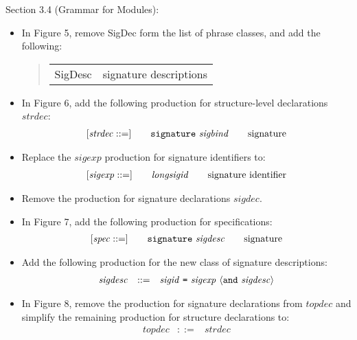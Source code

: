 \documentclass[twoside,titlepage]{article}
\begin{document}
\begin{appendix}
Section 3.4 (Grammar for Modules):
\begin{itemize}
\item In Figure 5, remove SigDec form the list of phrase classes, and add the following:
  \begin{quote}
  \begin{tabular}{ll}
  SigDesc & signature descriptions
  \end{tabular}
  \end{quote}

\item In Figure 6, add the following production for structure-level declarations $\mathit{strdec}$:
  $$
  \begin{array}{l@{\qquad}l@{\qquad}l}
  [\mathit{strdec} ::=] & {\tt{signature}}~\mathit{sigbind} & \textrm{signature} \\
  \end{array}
  $$

\item Replace the $\mathit{sigexp}$ production for signature identifiers to:
  $$
  \begin{array}{l@{\qquad}l@{\qquad}l}
  [\mathit{sigexp} ::=] & \mathit{longsigid} & \textrm{signature identifier} \\
  \end{array}
  $$

\item Remove the production for signature declarations $\mathit{sigdec}$.

\item In Figure 7, add the following production for specifications:
  $$
  \begin{array}{l@{\qquad}l@{\qquad}l}
  [\mathit{spec} ::=] & {\tt{signature}}~\mathit{sigdesc} & \textrm{signature} \\
  \end{array}
  $$

\item Add the following production for the new class of signature descriptions:
  $$
  \begin{array}{lll}
  \mathit{sigdesc} & ::= & \mathit{sigid}~\mbox{\tt=}~\mathit{sigexp}~\langle{\tt{and}}~\mathit{sigdesc}\rangle \\
  \end{array}
  $$

\item In Figure 8, remove the production for signature declarations from $\mathit{topdec}$ and simplify the remaining production for structure declarations to:
  $$
  \begin{array}{lll}
  \mathit{topdec} & ::= & \mathit{strdec} \\
  \end{array}
  $$


\end{itemize}
\end{appendix}
\end{document}
